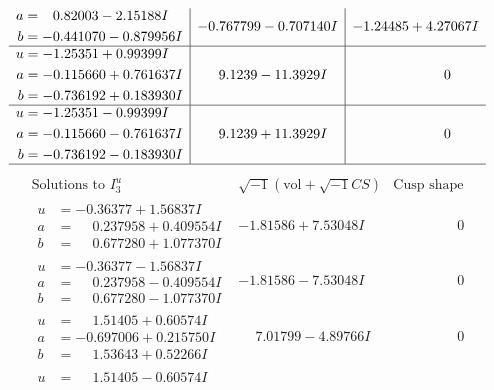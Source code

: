 \documentclass[1p]{elsarticle_modified}
\theoremstyle{definition}
\newcommand{\I}{\sqrt{-1}}
\begin{document}
$$\begin{array}{c|c|c}
\begin{aligned}
a &= \phantom{-}0.82003 - 2.15188 I \\
b &= -0.441070 - 0.879956 I\end{aligned}
 & -0.767799 - 0.707140 I & -1.24485 + 4.27067 I \\ \hline\begin{aligned}
u &= -1.25351 + 0.99399 I \\
a &= -0.115660 + 0.761637 I \\
b &= -0.736192 + 0.183930 I\end{aligned}
 & \phantom{-}9.1239 - 11.3929 I & \phantom{-0.000000 } 0 \\ \hline\begin{aligned}
u &= -1.25351 - 0.99399 I \\
a &= -0.115660 - 0.761637 I \\
b &= -0.736192 - 0.183930 I\end{aligned}
 & \phantom{-}9.1239 + 11.3929 I & \phantom{-0.000000 } 0\\
 \hline 
 \end{array}$$\newpage$$\begin{array}{c|c|c}  
\text{Solutions to }I^u_{3}& \I (\text{vol} + \sqrt{-1}CS) & \text{Cusp shape}\\
 \hline 
\begin{aligned}
u &= -0.36377 + 1.56837 I \\
a &= \phantom{-}0.237958 + 0.409554 I \\
b &= \phantom{-}0.677280 + 1.077370 I\end{aligned}
 & -1.81586 + 7.53048 I & \phantom{-0.000000 } 0 \\ \hline\begin{aligned}
u &= -0.36377 - 1.56837 I \\
a &= \phantom{-}0.237958 - 0.409554 I \\
b &= \phantom{-}0.677280 - 1.077370 I\end{aligned}
 & -1.81586 - 7.53048 I & \phantom{-0.000000 } 0 \\ \hline\begin{aligned}
u &= \phantom{-}1.51405 + 0.60574 I \\
a &= -0.697006 + 0.215750 I \\
b &= \phantom{-}1.53643 + 0.52266 I\end{aligned}
 & \phantom{-}7.01799 - 4.89766 I & \phantom{-0.000000 } 0 \\ \hline\begin{aligned}
u &= \phantom{-}1.51405 - 0.60574 I \\

\end{aligned}
\end{array}$$
\end{document}
